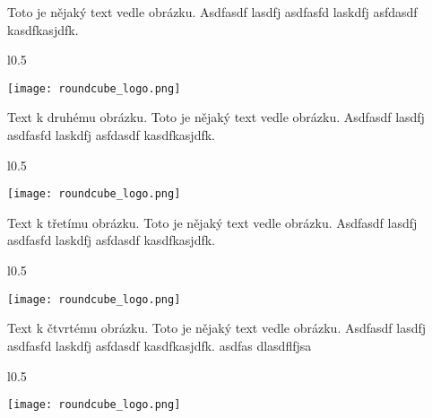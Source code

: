 \documentclass[12pt,a4paper,twoside]{book}
\begin{document}
Toto je nějaký text vedle obrázku. Asdfasdf lasdfj asdfasfd laskdfj asfdasdf kasdfkasjdfk.
\newline

\begin{wrapfigure}{l}{0.5\textwidth}
  \vspace{-20pt}
  \begin{center}
    \texttt{[image: roundcube\_logo.png]}
  \end{center}
  \vspace{-20pt}
\end{wrapfigure}

Text k druhému obrázku. Toto je nějaký text vedle obrázku. Asdfasdf lasdfj asdfasfd laskdfj asfdasdf kasdfkasjdfk.
\newline

\begin{wrapfigure}{l}{0.5\textwidth}
  \vspace{-20pt}
  \begin{center}
    \texttt{[image: roundcube\_logo.png]}
  \end{center}
  \vspace{-20pt}
\end{wrapfigure}

Text k třetímu obrázku. Toto je nějaký text vedle obrázku. Asdfasdf lasdfj asdfasfd laskdfj asfdasdf kasdfkasjdfk.
\newline

\begin{wrapfigure}{l}{0.5\textwidth}
  \vspace{-20pt}
  \begin{center}
    \texttt{[image: roundcube\_logo.png]}
  \end{center}
  \vspace{-20pt}
\end{wrapfigure}

Text k čtvrtému obrázku. Toto je nějaký text vedle obrázku. Asdfasdf lasdfj asdfasfd laskdfj asfdasdf kasdfkasjdfk.
\newline
asdfas dlasdflfjsa 

\begin{wrapfigure}{l}{0.5\textwidth}
  \vspace{-20pt}
  \begin{center}
    \texttt{[image: roundcube\_logo.png]}
  \end{center}
  \vspace{-20pt}
\end{wrapfigure}
\end{document}
